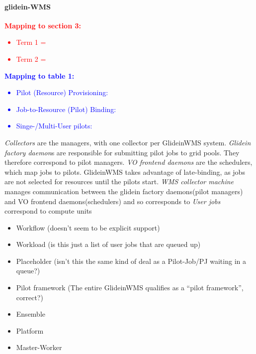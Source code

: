 \documentclass{sig-alternate}
\begin{document}
\paragraph{glidein-WMS}


\textcolor{red}
{
\textbf{Mapping to section 3:}
\begin{itemize}
\item Term 1 =
\item Term 2 =
\end{itemize}
}

\textcolor{blue}
{
\textbf{Mapping to table 1:}
\begin{itemize}
\item Pilot (Resource) Provisioning:
\item Job-to-Resource (Pilot) Binding:
\item Singe-/Multi-User pilots:
\end{itemize}
}

\textit{Collectors} are the managers, with one collector per
GlideinWMS system.
\textit{Glidein factory daemon}s are responsible for
submitting pilot jobs to grid pools.
They therefore correspond to pilot managers.
\textit{VO frontend daemons} are the schedulers, which map jobs
to pilots.  GlideinWMS takes advantage of late-binding, as
jobs are not selected for resources until the pilots start.
\textit{WMS collector machine} manages communication between the glidein
factory daemons(pilot managers) and VO frontend daemons(schedulers)
and so corresponds to 
\textit{User jobs} correspond to compute units 

\begin{itemize}
\item Workflow (doesn't seem to be explicit support)
\item Workload (is this just a list of user jobs that are queued up)
\item Placeholder (isn't this the same kind of deal as a Pilot-Job/PJ
waiting in a queue?)
\item Pilot framework (The entire GlideinWMS qualifies as a ``pilot
framework'', correct?)
\item Ensemble 
\item Platform 
\item Master-Worker 
\end{itemize}
\end{document}

